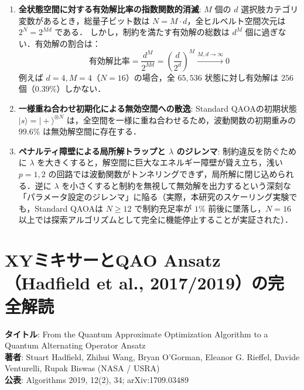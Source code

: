 \documentclass[11pt,a4paper,oneside,openany]{ltjsbook}
\theoremstyle{definition}
\theoremstyle{plain}
\theoremstyle{remark}
\newenvironment{alertbox}[1][]{\begin{cautionbox}[#1]}{\end{cautionbox}}
\newcommand{\ket}[1]{|#1\rangle}
\begin{document}
\vspace{-2mm}
\begin{alertbox}[ペナルティ法が抱える3大欠陥]
\begin{enumerate}\setlength{\itemsep}{0pt}\setlength{\parskip}{0pt}
    \item \textbf{全状態空間に対する有効解比率の指数関数的消滅}:
          $M$ 個の $d$ 選択肢カテゴリ変数があるとき，総量子ビット数は $N = M \cdot d$，全ヒルベルト空間次元は $2^N = 2^{M d}$ である．
          しかし，制約を満たす有効解の総数は $d^M$ 個に過ぎない．有効解の割合は：
          \begin{equation}
              \text{有効解比率} = \frac{d^M}{2^{Md}} = \left( \frac{d}{2^d} \right)^M \xrightarrow{M, d \to \infty} 0
          \end{equation}
          例えば $d=4, M=4$（$N=16$）の場合，全 $65,536$ 状態に対し有効解は $256$ 個（$0.39\%$）しかない．
    \item \textbf{一様重ね合わせ初期化による無効空間への散逸}:
          Standard QAOAの初期状態 $\ket{s} = \ket{+}^{\otimes N}$ は，全空間を一様に重ね合わせるため，波動関数の初期重みの $99.6\%$ は無効解空間に存在する．
    \item \textbf{ペナルティ障壁による局所解トラップと $\lambda$ のジレンマ}:
          制約違反を防ぐために $\lambda$ を大きくすると，解空間に巨大なエネルギー障壁が聳え立ち，浅い $p=1, 2$ の回路では波動関数がトンネリングできず，局所解に閉じ込められる\cite{choi2008different,hadfield2019from}．逆に $\lambda$ を小さくすると制約を無視して無効解を出力するという深刻な「パラメータ設定のジレンマ」に陥る（実際，本研究のスケーリング実験でも，Standard QAOAは $N \ge 12$ で制約充足率が $1\%$ 前後に墜落し，$N=16$ 以上では探索アルゴリズムとして完全に機能停止することが実証された）．
\end{enumerate}
\end{alertbox}

\chapter{XYミキサーとQAO Ansatz（Hadfield et al., 2017/2019）の完全解読}

\begin{paperbox}[原著論文データ]
\textbf{タイトル}: From the Quantum Approximate Optimization Algorithm to a Quantum Alternating Operator Ansatz\\
\textbf{著者}: Stuart Hadfield, Zhihui Wang, Bryan O'Gorman, Eleanor G. Rieffel, Davide Venturelli, Rupak Biswas (NASA / USRA)\\
\textbf{公表}: Algorithms 2019, 12(2), 34; arXiv:1709.03489
\end{paperbox}
\end{document}
